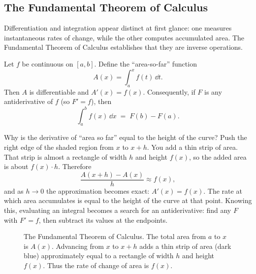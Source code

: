 \subsection{The Fundamental Theorem of Calculus}
\label{chAcla:ftc}

Differentiation and integration appear distinct at first glance: one measures
instantaneous rates of change, while the other computes accumulated area. The
Fundamental Theorem of Calculus establishes that they are inverse operations.

\begin{theorem}
\label{chAcla:thm-ftc}
Let $f$ be continuous on $[a,b]$. Define the ``area-so-far'' function
\[ A(x)=\int_a^x f(t)\,\dd t. \]
Then $A$ is differentiable and $A'(x)=f(x)$. Consequently,
if $F$ is any antiderivative of $f$ (so $F'=f$), then
\[
  \int_a^b f(x)\,\dd x \;=\; F(b)-F(a).
\]
\end{theorem}

\begin{whybox}
Why is the derivative of ``area so far'' equal to the height of the curve? Push the right edge of the
shaded region from $x$ to $x+h$. You add a thin strip of area. That strip is almost a rectangle of
width $h$ and height $f(x)$, so the added area is about $f(x)\cdot h$. Therefore
\[
  \frac{A(x+h)-A(x)}{h}\approx f(x),
\]
and as $h\to 0$ the approximation becomes exact: $A'(x)=f(x)$. The rate at which area accumulates
is equal to the height of the curve at that point.
Knowing this, evaluating an integral becomes a search for an antiderivative: find any $F$ with
$F'=f$, then subtract its values at the endpoints.
\end{whybox}

\begin{figure}[htbp]
\centering
{}
\caption{The Fundamental Theorem of Calculus. The total area from $a$ to $x$ is $A(x)$. Advancing from $x$ to $x+h$ adds a thin strip of area (dark blue) approximately equal to a rectangle of width $h$ and height $f(x)$. Thus the rate of change of area is $f(x)$.}
\label{chAcla:fig-ftc}
\end{figure}

